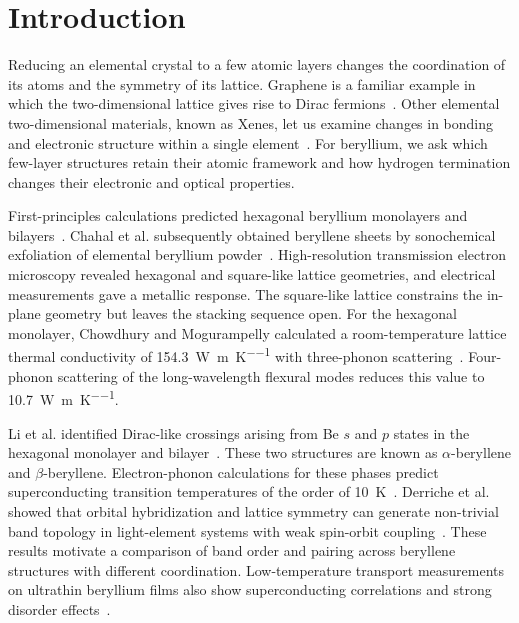 \FloatBarrier
\section{Introduction}
\label{3_introduction}

Reducing an elemental crystal to a few atomic layers changes the coordination of its atoms and the symmetry of its lattice.
Graphene is a familiar example in which the two-dimensional lattice gives rise to Dirac fermions~\cite{novoselov2004electric,geim2007rise}.
Other elemental two-dimensional materials, known as Xenes, let us examine changes in bonding and electronic structure within a single element~\cite{molle2018silicene}.
For beryllium, we ask which few-layer structures retain their atomic framework and how hydrogen termination changes their electronic and optical properties.

First-principles calculations predicted hexagonal beryllium monolayers and bilayers~\cite{ono2020dynamical,hess2022periodicity}.
Chahal et al. subsequently obtained beryllene sheets by sonochemical exfoliation of elemental beryllium powder~\cite{chahal2023beryllene}.
High-resolution transmission electron microscopy revealed hexagonal and square-like lattice geometries, and electrical measurements gave a metallic response.
The square-like lattice constrains the in-plane geometry but leaves the stacking sequence open.
For the hexagonal monolayer, Chowdhury and Mogurampelly calculated a room-temperature lattice thermal conductivity of \qty{154.3}{\watt\per\metre\per\kelvin} with three-phonon scattering~\cite{chowdhury2024unusual}.
Four-phonon scattering of the long-wavelength flexural modes reduces this value to \qty{10.7}{\watt\per\metre\per\kelvin}.

Li et al. identified Dirac-like crossings arising from Be $s$ and $p$ states in the hexagonal monolayer and bilayer~\cite{li2023coexistence}.
These two structures are known as $\alpha$-beryllene and $\beta$-beryllene.
Electron-phonon calculations for these phases predict superconducting transition temperatures of the order of \qty{10}{\kelvin}~\cite{li2023coexistence}.
Derriche et al. showed that orbital hybridization and lattice symmetry can generate non-trivial band topology in light-element systems with weak spin-orbit coupling~\cite{derriche2024light}.
These results motivate a comparison of band order and pairing across beryllene structures with different coordination.
Low-temperature transport measurements on ultrathin beryllium films also show superconducting correlations and strong disorder effects~\cite{xiong2009spin}.

